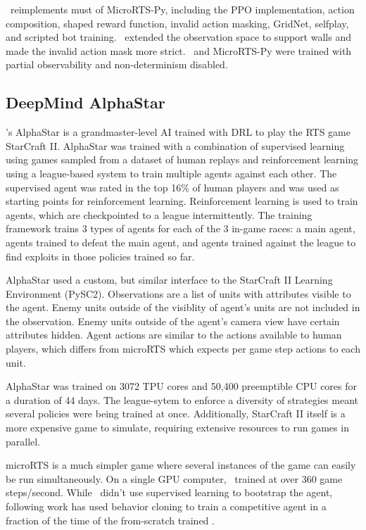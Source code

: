\documentclass{article}
\begin{document}
\agentName\ reimplements must of MicroRTS-Py, including the PPO implementation, action
composition, shaped reward function, invalid action masking, GridNet, selfplay, and
scripted bot training. \agentName\ extended the observation space to support walls and
made the invalid action mask more strict. \agentName\ and MicroRTS-Py were trained with partial
observability and non-determinism disabled.

\subsection{DeepMind AlphaStar}
\citet{Vinyals2019GrandmasterLI}'s AlphaStar is a grandmaster-level AI trained with DRL to play the RTS game
StarCraft II. AlphaStar was trained with a combination of supervised learning using
games sampled from a dataset of human replays and reinforcement learning using a
league-based system to train multiple agents against each other. The supervised agent
was rated in the top 16\% of human players and was used as starting points for
reinforcement learning. Reinforcement learning is used to train agents, which are
checkpointed to a league intermittently. The training framework trains 3 types of agents
for each of the 3 in-game races: a main agent, agents trained to defeat the main agent, and agents
trained against the league to find exploits in those policies trained so far.

AlphaStar used a custom, but similar interface to the StarCraft II Learning Environment
(PySC2). Observations are a list of units with attributes visible to the agent. Enemy
units outside of the visiblity of agent's units are not included in the observation.
Enemy units outside of the agent's camera view have certain attributes hidden. Agent
actions are similar to the actions available to human players, which differs from
microRTS which expects per game step actions to each unit.

AlphaStar was trained on 3072 TPU cores and 50,400 preemptible CPU cores for a duration of 44 days. The
league-sytem to enforce a diversity of strategies meant several policies were being
trained at once. Additionally, StarCraft II itself is a more expensive game to
simulate, requiring extensive resources to run games in parallel.

microRTS is a much simpler game where several instances of the game can easily be run
simultaneously. On a single GPU computer, \agentName\ trained at over 360 game
steps/second. While \agentName\ didn't use supervised learning to bootstrap the agent,
following work has used behavior cloning to train a competitive agent in a fraction of
the time of the from-scratch trained \agentName.
\end{document}
